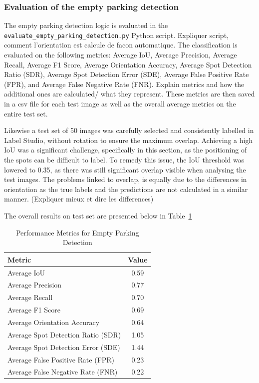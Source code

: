 \subsubsection{Evaluation of the empty parking detection}
The empty parking detection logic is evaluated in the \texttt{evaluate\_empty\_parking\_detection.py} Python script.
Expliquer script, comment l'orientation est calcule de facon automatique.
The classification is evaluated on the following metrics: Average IoU, Average Precision, Average Recall, Average F1 Score, Average Orientation Accuracy, Average Spot Detection Ratio (SDR), Average Spot Detection Error (SDE), Average False Positive Rate (FPR), and Average False Negative Rate (FNR).
Explain metrics and how the additional ones are calculated/ what they represent.
These metrics are then saved in a csv file for each test image as well as the overall average metrics on the entire test set.

Likewise a test set of 50 images was carefully selected and consistently labelled in Label Studio, without rotation to ensure the maximum overlap.
Achieving a high IoU was a significant challenge, specifically in this section, as the positioning of the spots can be difficult to label.
To remedy this issue, the IoU threshold was lowered to 0.35, as there was still significant overlap visible when analysing the test images.
The problems linked to overlap, is equally due to the differences in orientation as the true labels and the predictions are not calculated in a similar manner. (Expliquer mieux et dire les differences)

The overall results on test set are presented below in Table~\ref{tab:metrics2}

\begin{table}[h]
    \centering
    \begin{tabular}{|l|c|}
    \hline
    \textbf{Metric}                            & \textbf{Value} \\ \hline
    Average IoU                                & 0.59           \\ \hline
    Average Precision                          & 0.77           \\ \hline
    Average Recall                             & 0.70           \\ \hline
    Average F1 Score                           & 0.69           \\ \hline
    Average Orientation Accuracy               & 0.64           \\ \hline
    Average Spot Detection Ratio (SDR)         & 1.05           \\ \hline
    Average Spot Detection Error (SDE)         & 1.44           \\ \hline
    Average False Positive Rate (FPR)          & 0.23           \\ \hline
    Average False Negative Rate (FNR)          & 0.22           \\ \hline
    \end{tabular}
    \caption{Performance Metrics for Empty Parking Detection}
    \label{tab:metrics2}
\end{table}

